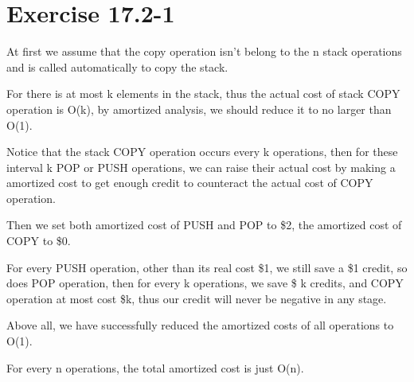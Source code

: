 \documentclass[oneside]{homework} %
\begin{document}
\maketitle
\newpage

\section*{Exercise 17.2-1}

At first we assume that the copy operation isn't belong to the n stack operations and is called automatically to copy the stack. 

For there is at most k elements in the stack, thus the actual cost of stack COPY operation is O(k), by amortized analysis, we should reduce it to no larger than O(1).

Notice that the stack COPY operation occurs every k operations, then for these interval k POP or PUSH operations, we can raise their actual cost by making a amortized cost to get enough credit to counteract the actual cost of COPY operation.

Then we set both amortized cost of PUSH and POP to \$2, the amortized cost of COPY to \$0.

For every PUSH operation, other than its real cost \$1, we still save a \$1 credit, so does POP operation, then for every k operations, we save \$ k credits, and COPY operation at most cost \$k, thus our credit will never be negative in any stage.

Above all, we have successfully reduced the amortized costs of all operations to O(1). 

For every n operations, the total amortized cost is just O(n).
\end{document}
